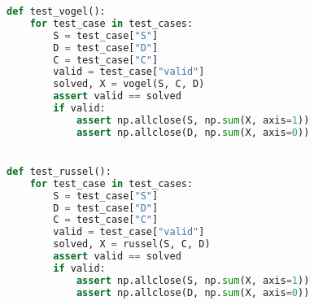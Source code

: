 \documentclass{article}
\begin{document}
\begin{lstlisting}[language=Python]
def test_vogel():
    for test_case in test_cases:
        S = test_case["S"]
        D = test_case["D"]
        C = test_case["C"]
        valid = test_case["valid"]
        solved, X = vogel(S, C, D)
        assert valid == solved
        if valid:
            assert np.allclose(S, np.sum(X, axis=1))
            assert np.allclose(D, np.sum(X, axis=0))


def test_russel():
    for test_case in test_cases:
        S = test_case["S"]
        D = test_case["D"]
        C = test_case["C"]
        valid = test_case["valid"]
        solved, X = russel(S, C, D)
        assert valid == solved
        if valid:
            assert np.allclose(S, np.sum(X, axis=1))
            assert np.allclose(D, np.sum(X, axis=0))
\end{lstlisting}
\end{document}
